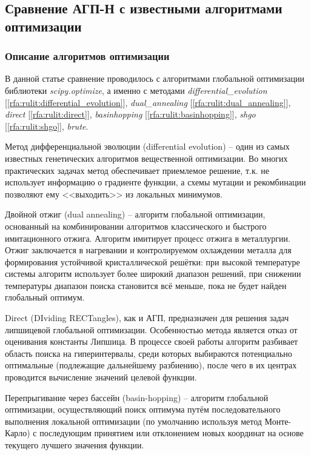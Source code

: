 \documentclass[a4paper,12pt,russian]{article}
\begin{document}
\subsection{Сравнение АГП-Н с известными алгоритмами оптимизации}

\subsubsection{Описание алгоритмов оптимизации}

В данной статье сравнение проводилось с алгоритмами глобальной оптимизации библиотеки \textit{scipy.optimize}, а именно с методами \textit{differential\_evolution} [\ref{rfa:rulit:differential_evolution}], \textit{dual\_annealing} [\ref{rfa:rulit:dual_annealing}], \textit{direct} [\ref{rfa:rulit:direct}], \textit{basinhopping} [\ref{rfa:rulit:basinhopping}], \textit{shgo} [\ref{rfa:rulit:shgo}], \textit{brute}.

Метод дифференциальной эволюции (differential evolution) -- один из самых известных генетических алгоритмов вещественной оптимизации. Во многих практических задачах метод обеспечивает приемлемое решение, т.к. не использует информацию о градиенте функции, а схемы мутации и рекомбинации позволяют ему <<выходить>> из локальных минимумов.

Двойной отжиг (dual annealing) -- алгоритм глобальной оптимизации, основанный на комбинировании алгоритмов классического и быстрого имитационного отжига. Алгоритм имитирует процесс отжига в металлургии. Отжиг заключается в нагревании и контролируемом охлаждении металла для формирования устойчивой кристаллической решётки: при высокой температуре системы алгоритм использует более широкий диапазон решений, при снижении температуры диапазон поиска становится всё меньше, пока не будет найден глобальный оптимум.

Direct (DIviding RECTangles), как и АГП, предназначен для решения задач липшицевой глобальной оптимизации. Особенностью метода является отказ от оценивания константы Липшица. В процессе своей работы алгоритм разбивает область поиска на гиперинтервалы, среди которых выбираются потенциально оптимальные (подлежащие дальнейшему разбиению), после чего в их центрах проводится вычисление значений целевой функции.

Перепрыгивание через бассейн (basin-hopping) -- алгоритм глобальной оптимизации, осуществляющий поиск оптимума путём последовательного выполнения локальной оптимизации (по умолчанию используя метод Монте-Карло) с последующим принятием или отклонением новых координат на основе текущего лучшего значения функции.
\end{document}
